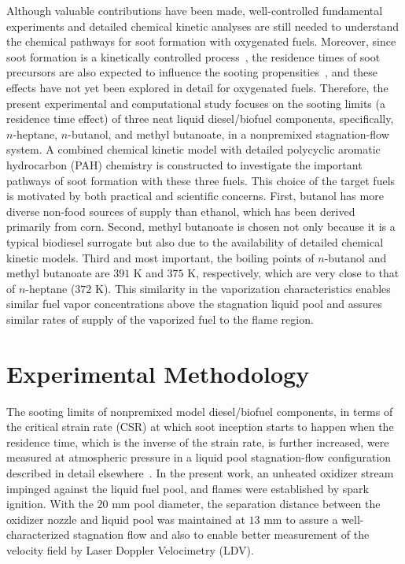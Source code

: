\documentclass[review,3p,times]{elsarticleUS}
\begin{document}
Although valuable contributions have been made, well-controlled fundamental experiments and detailed chemical kinetic analyses are still needed to understand the chemical pathways for soot formation with oxygenated fuels. Moreover, since soot formation is a kinetically controlled process~\cite{vandsburger85}, the residence times of soot precursors are also expected to influence the sooting propensities~\cite{tsuji71}, and these effects have not yet been explored in detail for oxygenated fuels. Therefore, the present experimental and computational study focuses on the sooting limits (a residence time effect) of three neat liquid diesel/biofuel components, specifically, $n$-heptane, $n$-butanol, and methyl butanoate, in a nonpremixed stagnation-flow system. A combined chemical kinetic model with detailed polycyclic aromatic hydrocarbon (PAH) chemistry is constructed to investigate the important pathways of soot formation with these three fuels. This choice of the target fuels is motivated by both practical and 
scientific concerns. First, butanol has more diverse non-food sources of supply 
than ethanol, which has been derived primarily from corn. Second, methyl butanoate is chosen not only because it is a typical biodiesel surrogate but also due to the availability of detailed chemical kinetic models. Third and most important, the boiling points of $n$-butanol and methyl butanoate are $391$ K and $375$ K, respectively, which are very close to that of $n$-heptane ($372$ K). This similarity in the vaporization characteristics enables similar fuel vapor concentrations above the stagnation liquid pool and assures similar rates of supply of the vaporized fuel to the flame region.


\section{Experimental Methodology}
\label{sec:2}

The sooting limits of nonpremixed model diesel/biofuel components, in terms of the critical strain rate (CSR) at which soot inception starts to happen when the residence time, which is the inverse of the strain rate, is further increased, were measured at atmospheric pressure in a liquid pool stagnation-flow configuration described in detail elsewhere~\cite{liu10}. In the present work, an unheated oxidizer stream impinged against the liquid fuel pool, and flames were established by spark ignition. With the $20$ mm pool diameter, the separation distance between the oxidizer nozzle and liquid pool was maintained at $13$ mm to assure a well-characterized stagnation flow and also to enable better measurement of the velocity field by Laser Doppler Velocimetry (LDV).
\end{document}
